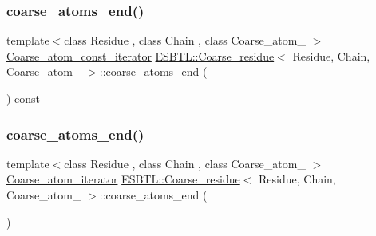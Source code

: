 \subsubsection{\texorpdfstring{coarse\+\_\+atoms\+\_\+end()}{coarse\_atoms\_end()}\hspace{0.1cm}{\footnotesize\ttfamily [1/4]}}
{\footnotesize\ttfamily template$<$class Residue , class Chain , class Coarse\+\_\+atom\+\_\+ $>$ \\
\hyperlink{group__grp__iters_ga5a4a865846cdde342538df7fc03c80ce}{Coarse\+\_\+atom\+\_\+const\+\_\+iterator} \hyperlink{classESBTL_1_1Coarse__residue}{E\+S\+B\+T\+L\+::\+Coarse\+\_\+residue}$<$ Residue, Chain, Coarse\+\_\+atom\+\_\+ $>$\+::coarse\+\_\+atoms\+\_\+end (\begin{DoxyParamCaption}{ }\end{DoxyParamCaption}) const\hspace{0.3cm}{\ttfamily [inline]}}

\mbox{\label{group__grp__iters_ga2594d683372e0e198f725d8bd1577adf}} 
\subsubsection{\texorpdfstring{coarse\+\_\+atoms\+\_\+end()}{coarse\_atoms\_end()}\hspace{0.1cm}{\footnotesize\ttfamily [2/4]}}
{\footnotesize\ttfamily template$<$class Residue , class Chain , class Coarse\+\_\+atom\+\_\+ $>$ \\
\hyperlink{group__grp__iters_ga09a38741d50d3b7296dae83eb0911e49}{Coarse\+\_\+atom\+\_\+iterator} \hyperlink{classESBTL_1_1Coarse__residue}{E\+S\+B\+T\+L\+::\+Coarse\+\_\+residue}$<$ Residue, Chain, Coarse\+\_\+atom\+\_\+ $>$\+::coarse\+\_\+atoms\+\_\+end (\begin{DoxyParamCaption}{ }\end{DoxyParamCaption})\hspace{0.3cm}{\ttfamily [inline]}}

\mbox{\label{group__grp__iters_gaa526c599e8abd3960e6b16ec2c6ed522}} 
